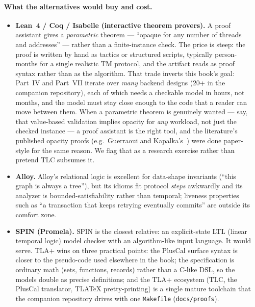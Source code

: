 \paragraph{What the alternatives would buy and cost.}

\begin{itemize}
\item \textbf{Lean~4 / Coq / Isabelle (interactive theorem provers).}
  A proof assistant gives a \emph{parametric} theorem --- ``opaque for any
  number of threads and addresses'' --- rather than a finite-instance check.
  The price is steep: the proof is written by hand as tactics or structured
  scripts, typically person-months for a single realistic TM protocol, and the
  artifact reads as proof syntax rather than as the algorithm.  That trade
  inverts this book's goal: Part~IV and Part~VII iterate over \emph{many}
  backend designs (20+ in the companion repository), each of which needs a
  checkable model in hours, not months, and the model must stay close enough to
  the code that a reader can move between them.  When a parametric theorem is
  genuinely wanted --- say, that value-based validation implies opacity for
  \emph{any} workload, not just the checked instance --- a proof assistant is
  the right tool, and the literature's published opacity proofs
  (e.g.\ Guerraoui and Kapalka's~\cite{guerraoui08correctness}) were done
  paper-style for the same reason.  We flag that as a research exercise rather
  than pretend TLC subsumes it.
\item \textbf{Alloy.}  Alloy's relational logic is excellent for data-shape
  invariants (``this graph is always a tree''), but its idioms fit protocol
  \emph{steps} awkwardly and its analyzer is bounded-satisfiability rather than
  temporal; liveness properties such as ``a transaction that keeps retrying
  eventually commits'' are outside its comfort zone.
\item \textbf{SPIN (Promela).}  SPIN is the closest relative: an
  explicit-state LTL (linear temporal logic) model checker with an
  algorithm-like input language.  It
  would serve.  TLA+ wins on three practical points: the PlusCal surface syntax
  is closer to the pseudo-code used elsewhere in the book; the specification is
  ordinary math (sets, functions, records) rather than a C-like DSL, so the
  models double as precise definitions; and the TLA+ ecosystem (TLC, the
  PlusCal translator, TLATeX pretty-printing) is a single mature toolchain that
  the companion repository drives with one \texttt{Makefile}
  (\texttt{docs/proofs}).
\end{itemize}

